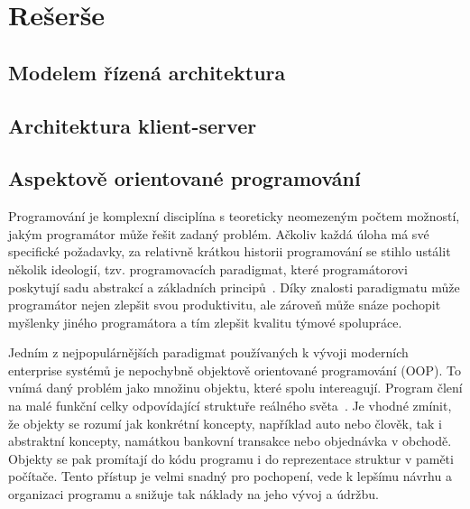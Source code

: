 
\chapter{Rešerše}\label{ch:reserse}

\section{Modelem řízená architektura}


\section{Architektura klient-server}\label{sec:client-server}


\section{Aspektově orientované programování}

Programování je komplexní disciplína s teoreticky
neomezeným počtem možností, jakým programátor může
řešit zadaný problém. Ačkoliv každá úloha má své specifické
požadavky, za relativně krátkou historii programování se
stihlo ustálit několik ideologií, tzv. programovacích
paradigmat, které programátorovi poskytují sadu abstrakcí
a základních principů~\cite{van2009programming}.
Díky znalosti paradigmatu může programátor nejen zlepšit
svou produktivitu, ale zároveň může snáze pochopit myšlenky
jiného programátora a tím zlepšit kvalitu týmové spolupráce.

Jedním z nejpopulárnějších paradigmat používaných k
vývoji moderních enterprise systémů je nepochybně
objektově orientované programování (OOP). To vnímá daný problém
jako množinu objektu, které spolu intereagují. Program
člení na malé funkční celky odpovídající struktuře
reálného světa~\cite{rentsch1982object}. Je vhodné zmínit,
že objekty se rozumí jak konkrétní koncepty, například
auto nebo člověk, tak i abstraktní koncepty,
namátkou bankovní transakce nebo objednávka v obchodě.
Objekty se pak promítají do kódu programu i do
reprezentace struktur v paměti počítače.
Tento přístup je velmi snadný pro pochopení,
vede k lepšímu návrhu a organizaci programu a snižuje
tak náklady na jeho vývoj a údržbu.

